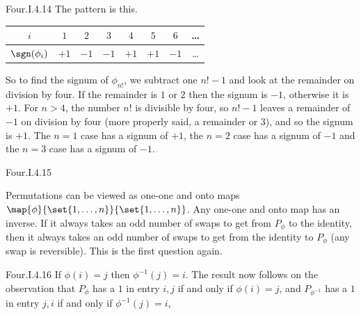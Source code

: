 \begin{ans}{Four.I.4.14}
      The pattern is this.
      \begin{center}
         \begin{tabular}[b]{c|ccccccc}
           \( i \) &\( 1 \) &\( 2 \) &\( 3 \) &\( 4 \) &\( 5 \)
              &\( 6 \) &\ldots \\
           \hline
           \( \sgn(\phi_i) \) &\( +1 \) &\( -1 \) &\( -1 \) &\( +1 \)
              &\( +1 \) &\( -1 \) &\ldots
         \end{tabular}
      \end{center}
      So to find the signum of $\phi_{n!}$, we subtract one $n!-1$ and
      look at the remainder on division by four.
      If the remainder is $1$ or $2$ then the signum is $-1$, otherwise it
      is $+1$.
      For $n>4$, the number $n!$ is divisible by four, so $n!-1$ leaves a
      remainder of $-1$ on division by four (more properly said, a remainder
      or $3$), and so the signum is $+1$.
      The $n=1$ case has a signum of $+1$, the $n=2$ case has a signum of
      $-1$ and the $n=3$ case has a signum of $-1$.
    
\end{ans}
\begin{ans}{Four.I.4.15}
      \begin{exparts}
       \partsitem Permutations can be viewed as one-one and onto maps
         \( \map{\phi}{\set{1,\ldots,n}}{\set{1,\ldots,n}} \).
         Any one-one and onto map has an inverse.
       \partsitem If it always takes an odd number of swaps to get
         from \( P_\phi \)
         to the identity, then it always takes an odd number of swaps
         to get from the identity to \( P_\phi \) (any swap is reversible).
       \partsitem This is the first question again.
     \end{exparts}
    
\end{ans}
\begin{ans}{Four.I.4.16}
        If $\phi(i)=j$ then $\phi^{-1}(j)=i$.
        The result now follows on the observation that $P_{\phi}$ has a
        $1$ in entry $i,j$ if and only if $\phi(i)=j$,
        and $P_{\phi^{-1}}$ has a
        $1$ in entry $j,i$ if and only if $\phi^{-1}(j)=i$,
      
\end{ans}
